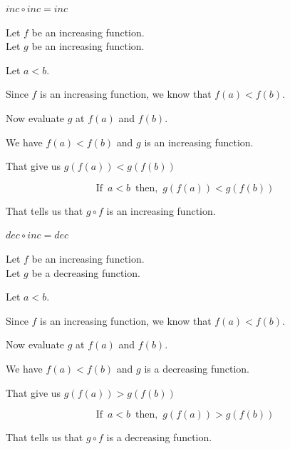 \documentclass{ximera}
\begin{document}
\begin{fact}  \textbf{\textcolor{red!75!green}{$inc \circ inc = inc$}} 

Let $f$ be an increasing function. \\
Let $g$ be an increasing function.


Let $a < b$.

Since $f$ is an increasing function, we know that $f(a) < f(b)$.

Now evaluate $g$ at $f(a)$ and $f(b)$.


We have $f(a) < f(b)$ and $g$ is an increasing function. 

That give us $g(f(a)) < g(f(b))$



\[ \text{If } \, a < b \, \text{ then, } \, g(f(a)) < g(f(b)) \]

That tells us that $g \circ f$ is an increasing function.

\end{fact}








\begin{fact}  \textbf{\textcolor{red!75!green}{$dec \circ inc = dec$}} 

Let $f$ be an increasing function. \\
Let $g$ be a decreasing function.


Let $a < b$.

Since $f$ is an increasing function, we know that $f(a) < f(b)$.

Now evaluate $g$ at $f(a)$ and $f(b)$.


We have $f(a) < f(b)$ and $g$ is a decreasing function. 

That give us $g(f(a)) > g(f(b))$



\[ \text{If } \, a < b \, \text{ then, } \, g(f(a)) > g(f(b)) \]

That tells us that $g \circ f$ is a decreasing function.

\end{fact}
\end{document}
